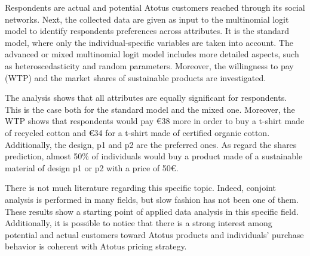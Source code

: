 \documentclass[%
    corpo=11pt,
    twoside, %
    oldstyle,
    autoretitolo,
    greek,
    evenboxes,
]{toptesi}
\begin{document}
Respondents are actual and potential Atotus customers reached through its social networks. Next, the collected data are given as input to the multinomial logit model to identify respondents preferences across attributes. It is the standard model, where only the individual-specific variables are taken into account. The advanced or mixed multinomial logit model includes more detailed aspects, such as heteroscedasticity and random parameters. Moreover, the willingness to pay (WTP) and the market shares of sustainable products are investigated. 

The analysis shows that all attributes are equally significant for respondents. This is the case both for the standard model and the mixed one. Moreover, the WTP shows that respondents would pay €38 more in order to buy a t-shirt made of recycled cotton and €34 for a t-shirt made of certified organic cotton. Additionally, the design, p1 and p2 are the preferred ones. As regard the shares prediction, almost 50\% of individuals would buy a product made of a  sustainable material of design p1 or p2 with a price of 50€. 

There is not much literature regarding this specific topic. Indeed, conjoint analysis is performed in many fields, but slow fashion has not been one of them. These results show a starting point of applied data analysis in this specific field. Additionally, it is possible to notice that there is a strong interest among potential and actual customers toward Atotus products and individuals' purchase behavior is coherent with Atotus pricing strategy.




  \tablespagetrue     %
  \figurespagetrue   %
  \indici	             %









%

\end{document}
